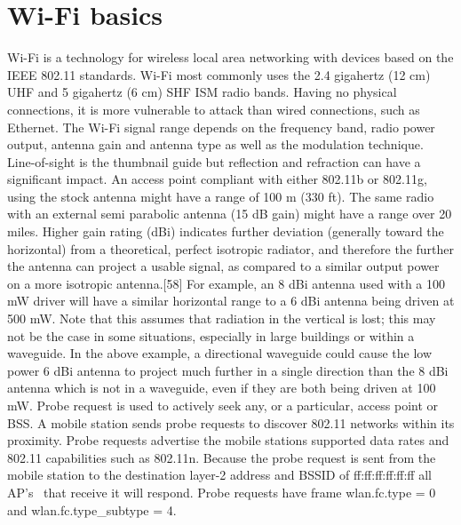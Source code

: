 \documentclass[a4paper,11pt]{article}
\begin{document}
\section{Wi-Fi basics}
Wi-Fi is a technology for wireless local area networking with devices based on the IEEE 802.11 standards. Wi-Fi most commonly uses the 2.4 gigahertz (12 cm) UHF and 5 gigahertz (6 cm) SHF ISM radio bands. Having no physical connections, it is more vulnerable to attack than wired connections, such as Ethernet. The Wi-Fi signal range depends on the frequency band, radio power output, antenna gain and antenna type as well as the modulation technique. Line-of-sight is the thumbnail guide but reflection and refraction can have a significant impact. An access point compliant with either 802.11b or 802.11g, using the stock antenna might have a range of 100 m (330 ft). The same radio with an external semi parabolic antenna (15 dB gain) might have a range over 20 miles. Higher gain rating (dBi) indicates further deviation (generally toward the horizontal) from a theoretical, perfect isotropic radiator, and therefore the further the antenna can project a usable signal, as compared to a similar output power on a more isotropic antenna.[58] For example, an 8 dBi antenna used with a 100 mW driver will have a similar horizontal range to a 6 dBi antenna being driven at 500 mW. Note that this assumes that radiation in the vertical is lost; this may not be the case in some situations, especially in large buildings or within a waveguide. In the above example, a directional waveguide could cause the low power 6 dBi antenna to project much further in a single direction than the 8 dBi antenna which is not in a waveguide, even if they are both being driven at 100 mW.
Probe request is used to actively seek any, or a particular, access point or BSS. A mobile station sends probe requests to discover 802.11 networks within its proximity. Probe requests advertise the mobile stations supported data rates and 802.11 capabilities such as 802.11n. Because the probe request is sent from the mobile station to the destination layer-2 address and BSSID of ff:ff:ff:ff:ff:ff all AP's  that receive it will respond. Probe requests have frame wlan.fc.type = 0 and wlan.fc.type\_subtype = 4.
\end{document}
